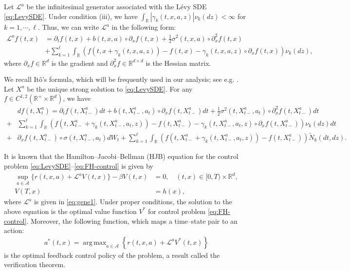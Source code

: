 \documentclass[11pt]{article}
\newcommand{\1}{\mathbbm{1}}
\DeclareMathOperator*{\argmax}{arg\,max}
\begin{document}
Let $\mathcal{L}^a$ be the infinitesimal generator associated with the L{\'e}vy SDE \eqref{eq:LevySDE}. Under condition (iii), we have $	\int_{\mathbb{R}}|\gamma_k(t,x,a,z)|\nu_k(dz)<\infty$ for $k=1,\cdots,\ell$.
Thus, we can write $\mathcal{L}^a$ in the following form:
\begin{align}\label{eq:gene1}
	\mathcal{L}^a f(t,x) &= \partial_t f(t,x) + b(t, x, a) \circ \partial_x f  (t,x) + \frac{1}{2} \sigma^2(t,x,a) \circ \partial^2_x f(t,x) \nonumber \\
	&+ \sum_{k=1}^\ell \int_{\mathbb{R}} \left( f(t, x+ \gamma_k(t, x ,a, z)) - f(t,x) - \gamma_k(t,x,a,z) \circ \partial_xf(t,x) \right) \nu_k (dz),
\end{align}
where $\partial_xf\in\mathbb{R}^d$ is the gradient and $\partial^2_x f\in\mathbb{R}^{d\times d}$ is the Hessian matrix.

We recall It\^o's formula, which will be frequently used in our analysis; see e.g. \cite[Theorem 1.16]{oksendal2007applied}. Let $X^a$ be the unique strong solution to  \eqref{eq:LevySDE}. For any $f\in C^{1,2}(\mathbb{R}^+\times\mathbb{R}^d)$, we have
\begin{align}
	&df(t,X^a_t)=\partial_t f(t,X^a_{t-})dt + b(t,X^a_{t-},a_t)\circ \partial_x f(t,X^a_{t-})dt + \frac{1}{2}\sigma^2(t,X^a_{t-},a_t) \circ\partial_x^2 f(t,X^a_{t-})dt\\
	+&\sum_{k=1}^\ell \int_{\mathbb{R}} \left( f(t, X^a_{t-}+ \gamma_k(t, X^a_{t-}, a_{t}, z)) - f(t,X^a_{t-}) - \gamma_k(t,X^a_{t-}, a_{t}, z) \circ  \partial_x f(t,X^a_{t-}) \right) \nu_k (dz)dt\\
	+&\partial_x f(t, X^a_{t-})\circ \sigma(t,X^a_{t-},a_t)dW_t+\sum_{k=1}^\ell \int_{\mathbb{R}} \left( f(t, X^a_{t-}+ \gamma_k(t, X^a_{t-}, a_{t}, z)) - f(t,X^a_{t-})\right) \widetilde{N}_k (dt,dz).\label{eq:Ito-JD}
\end{align}


It is known that the Hamilton--Jacobi--Bellman (HJB)  equation for the control problem \eqref{eq:LevySDE}--\eqref{eq:FH-control} is given by
\begin{align} \label{eq:hjb-pde1}
	\sup_{a \in \mathcal{A}} \{ r(t, x,a) + \mathcal{L}^a V(t,x) \}  - \beta V(t,x) & =0, \quad (t,x) \in [0, T)\times\mathbb{R}^d,\\
	V(T,x) &=h (x), \nonumber
\end{align}
where $\mathcal{L}^a$ is given in \eqref{eq:gene1}.
Under proper conditions, the solution to the above equation is the optimal value function $V^*$ for control problem \eqref{eq:FH-control}. Moreover, the following function, which maps a time--state pair to an action:
\begin{align}\label{vt}
	a^*(t,x) = \argmax_{a \in \mathcal{A}} \left\{ r(t, x,a) + \mathcal{L}^a V^*(t,x)  \right\}
\end{align}
is the optimal feedback control policy of the problem, a result called the verification theorem.
\end{document}

